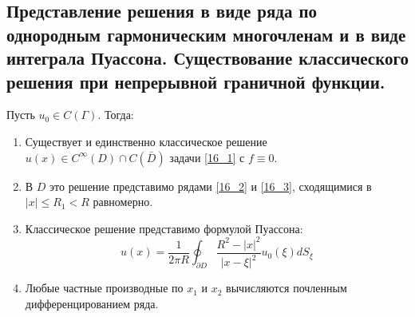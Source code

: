 \subsection{Представление решения в виде ряда по однородным гармоническим многочленам и в виде интеграла Пуассона. Существование классического решения при непрерывной граничной функции.}
\begin{theorem}
Пусть $u_0 \in C(\Gamma)$. Тогда:
\begin{enumerate}
\item Существует и единственно классическое решение $u(x) \in C^\infty(D) \cap C(\bar D)$ задачи \ref{16_1} с $f \equiv 0$.
\item В $D$ это решение представимо рядами \ref{16_2} и \ref{16_3}, сходящимися в $|x| \leq R_1 < R$ равномерно.
\item Классическое решение представимо формулой Пуассона: \[u(x) = \frac{1}{2\pi R} \oint_{\partial D} \frac{R^2 - |x|^2}{|x- \xi|^2}u_0(\xi) dS_\xi\]
\item Любые частные производные по $x_1$ и $x_2$ вычисляются почленным дифференцированием ряда.
\end{enumerate}
\end{theorem}
